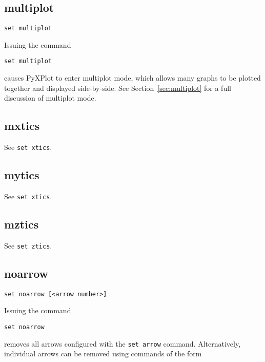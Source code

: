 \subsection{multiplot}

\begin{verbatim}
set multiplot
\end{verbatim}

Issuing the command

\begin{verbatim}
set multiplot
\end{verbatim}

\noindent causes PyXPlot to enter multiplot mode, which allows many graphs to
be plotted together and displayed side-by-side. See Section~\ref{sec:multiplot}
for a full discussion of multiplot mode.


\subsection{mxtics}

See {\tt set xtics}.


\subsection{mytics}

See {\tt set xtics}.


\subsection{mztics}

See {\tt set ztics}.


\subsection{noarrow}

\begin{verbatim}
set noarrow [<arrow number>]
\end{verbatim}

Issuing the command

\begin{verbatim}
set noarrow
\end{verbatim}

\noindent removes all arrows configured with the {\tt set arrow} command.
Alternatively, individual arrows can be removed using commands of the form

